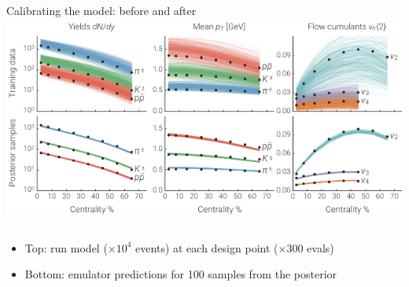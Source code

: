 \documentclass[xcolor=dvipsnames, aspectratio=169]{beamer}
\begin{document}
\begin{frame}{Calibrating the model: before and after}
    \medskip \centering
    \includegraphics{observables_plot} \\
    \bigskip
    \begin{columns}
    \begin{column}{0.8\textwidth}
    \begin{itemize}
        \small
        \item Top: run model ($\times 10^4$ events) at each design 
              point ($\times300$ evals)
        \vspace{0.2 cm}
        \item Bottom: emulator predictions for 100 samples from 
              the posterior
    \end{itemize}
    \end{column}
    \end{columns}
\end{frame}
\end{document}
